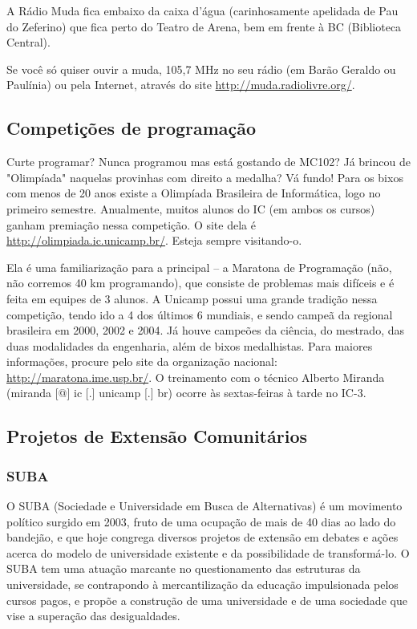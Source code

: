 A Rádio Muda fica embaixo da caixa d'água (carinhosamente apelidada de Pau do
Zeferino) que fica perto do Teatro de Arena, bem em frente à BC (Biblioteca
Central).

Se você só quiser ouvir a muda, 105,7 MHz no seu rádio (em Barão Geraldo ou
Paulínia) ou pela Internet, através do site \url{http://muda.radiolivre.org/}.

\subsection{Competições de programação}

Curte programar? Nunca programou mas está gostando de MC102? Já brincou de
"Olimpíada" naquelas provinhas com direito a medalha? Vá fundo! Para os bixos
com menos de 20 anos existe a Olimpíada Brasileira de Informática, logo no primeiro
semestre. Anualmente, muitos alunos do IC (em ambos os cursos) ganham premiação
nessa competição. O site dela é \url{http://olimpiada.ic.unicamp.br/}. Esteja
sempre visitando-o.

Ela é uma familiarização para a principal -- a Maratona de Programação (não, não
corremos 40 km programando), que consiste de problemas mais difíceis e é feita
em equipes de 3 alunos. A Unicamp possui uma grande tradição nessa competição,
tendo ido a 4 dos últimos 6 mundiais, e sendo campeã da regional brasileira em
2000, 2002 e 2004. Já houve campeões da ciência, do mestrado, das duas
modalidades da engenharia, além de bixos medalhistas. Para maiores informações,
procure pelo site da organização nacional: \url{http://maratona.ime.usp.br/}.
O treinamento com o técnico Alberto Miranda (miranda [@] ic [.] unicamp [.] br)
ocorre às sextas-feiras à tarde no IC-3.

\subsection{Projetos de Extensão Comunitários}
\subsubsection{SUBA}

O SUBA (Sociedade e Universidade em Busca de Alternativas) é um movimento
político surgido em 2003, fruto de uma ocupação de mais de 40 dias ao lado do
bandejão, e que hoje congrega diversos projetos de extensão em debates e ações
acerca do modelo de universidade existente e da possibilidade de transformá-lo.
O SUBA tem uma atuação marcante no questionamento das estruturas da
universidade, se contrapondo à mercantilização da educação impulsionada pelos
cursos pagos, e propõe a construção de uma universidade e de uma sociedade que
vise a superação das desigualdades.

